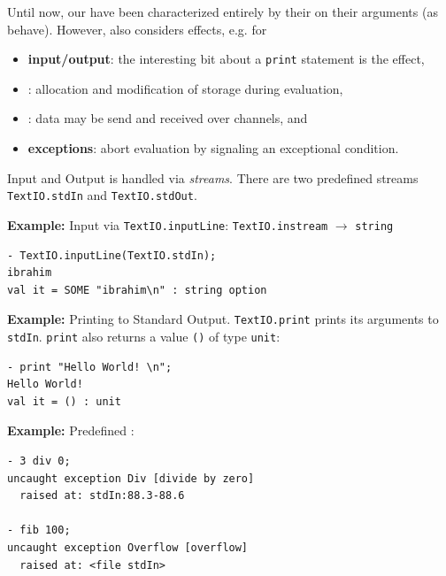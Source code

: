 Until now, our  have been characterized entirely by their  on their arguments (as   behave). However,  also considers effects, e.g. for
\begin{itemize}
    \item \textbf{input/output}: the interesting bit about a \texttt{print} statement is the effect,
    \item {}: allocation and modification of storage during evaluation,
    \item {}: data may be send and received over channels, and
    \item \textbf{exceptions}: abort evaluation by signaling an exceptional condition.
\end{itemize} 

Input and Output is handled via \textit{streams}. There are two predefined streams \texttt{TextIO.stdIn} and \texttt{TextIO.stdOut}.

\textbf{Example: } Input via \texttt{TextIO.inputLine}: \texttt{TextIO.instream} $\to$ \texttt{string}
\begin{verbatim}
- TextIO.inputLine(TextIO.stdIn);
ibrahim
val it = SOME "ibrahim\n" : string option
\end{verbatim}

\textbf{Example: } Printing to Standard Output. \texttt{TextIO.print} prints its arguments to \texttt{stdIn}. \texttt{print} also returns a value \texttt{()} of type \texttt{unit}:
\begin{verbatim}
- print "Hello World! \n";
Hello World!
val it = () : unit
\end{verbatim}

\textbf{Example: }Predefined :
\begin{verbatim}
- 3 div 0;
uncaught exception Div [divide by zero]
  raised at: stdIn:88.3-88.6

- fib 100;
uncaught exception Overflow [overflow]
  raised at: <file stdIn>
\end{verbatim}

